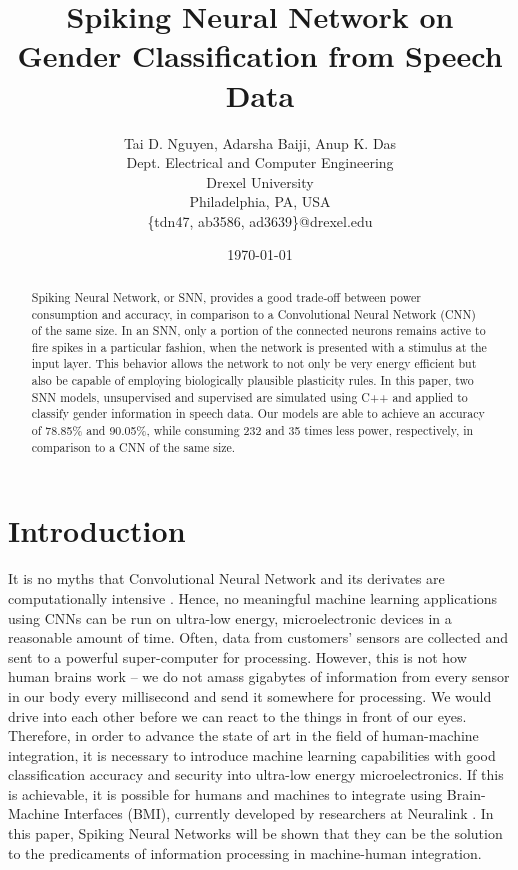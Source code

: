 \documentclass[11pt]{article}  %
\title{Spiking Neural Network on \\ Gender Classification from Speech Data}
\author{
	Tai D. Nguyen,  Adarsha Baiji, Anup K. Das\\
	Dept. Electrical and Computer Engineering \\
	Drexel University \\
	Philadelphia, PA, USA \\
	\{tdn47, ab3586, ad3639\}@drexel.edu
}
\date{\today}
\begin{document}
\maketitle

\begin{abstract}
 Spiking Neural Network, or SNN, provides a good trade-off between power consumption and accuracy, in comparison to a Convolutional Neural Network (CNN) of the same size. In an SNN, only a portion of the connected neurons remains active to fire spikes in a particular fashion, when the network is presented with a stimulus at the input layer. This behavior allows the network to not only be very energy efficient but also be capable of employing biologically plausible plasticity rules. In this paper, two SNN models, unsupervised and supervised are simulated using C++ and applied to classify gender information in speech data. Our models are able to achieve an accuracy of 78.85\% and 90.05\%, while consuming 232 and 35 times less power, respectively, in comparison to a CNN of the same size.
\end{abstract}

\section{Introduction}
\label{intro}

It is no myths that Convolutional Neural Network and its derivates are computationally intensive \cite{b1}. Hence, no meaningful machine learning applications using CNNs can be run on ultra-low energy, microelectronic devices in a reasonable amount of time. Often, data from customers' sensors are collected and sent to a powerful super-computer for processing. However, this is not how human brains work -- we do not amass gigabytes of information from every sensor in our body every millisecond and send it somewhere for processing. We would drive into each other before we can react to the things in front of our eyes. Therefore, in order to advance the state of art in the field of human-machine integration, it is necessary to introduce machine learning capabilities with good classification accuracy and security into ultra-low energy microelectronics. If this is achievable, it is possible for humans and machines to integrate using Brain-Machine Interfaces (BMI), currently developed by researchers at Neuralink \cite{b2}. In this paper, Spiking Neural Networks will be shown that they can be the solution to the predicaments of information processing in machine-human integration. 
\end{document}
